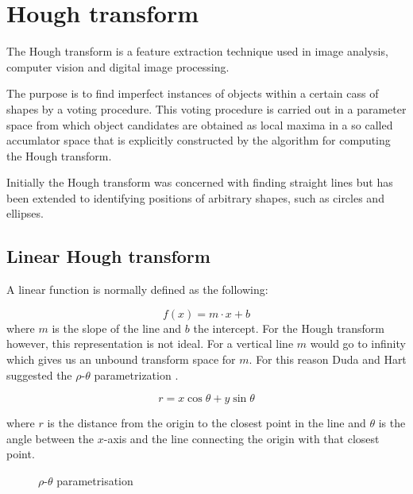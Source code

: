 \documentclass[11pt,twoside]{scrreprt}
\begin{document}

\section{Hough transform} %
\label{sec:hough_transform}

The Hough transform is a feature extraction technique used in image analysis, computer vision and digital image processing.

The purpose is to find imperfect instances of objects within a certain cass of shapes by a voting procedure. This voting procedure is carried out in a parameter space from which object candidates are obtained as local maxima in a so called accumlator space that is explicitly constructed by the algorithm for computing the Hough transform.

Initially the Hough transform was concerned with finding straight lines but has been extended to identifying positions of arbitrary shapes, such as circles and ellipses.

\subsection{Linear Hough transform} %
\label{sub:linear_hough_transform}

A linear function is normally defined as the following:

\[
  f(x) = m\cdot x + b
\]
where $m$ is the slope of the line and $b$ the intercept. For the Hough transform however, this representation is not ideal. For a vertical line $m$ would go to infinity which gives us an unbound transform space for $m$. For this reason Duda and Hart suggested the $\rho\text{-}\theta$ parametrization \parencite{Duda:1972}.

\begin{equation}
  r = x\cos\theta + y\sin\theta\label{eq:param_eq}
\end{equation}

where $r$ is the distance from the origin to the closest point in the line and $\theta$ is the angle between the $x$-axis and the line connecting the origin with that closest point.

\begin{figure}[ht]
  \centering
  \caption{$\rho\text{-}\theta$ parametrisation}
  \label{fig:rhotheta}
\end{figure}
\end{document}
